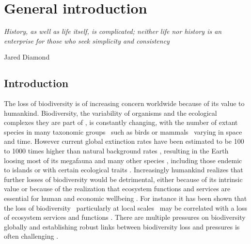 \chapter{General introduction}
\epigraph{\emph{History, as well as life itself, is complicated; neither life nor history is an enterprise for those who seek simplicity and consistency}}{Jared Diamond}
\label{C01}

\section{Introduction}
\label{C01_01}

The loss of biodiversity is of increasing concern worldwide because of its value to humankind. Biodiversity, the variability of organisms and the ecological complexes they are part of \citep{SecretariatoftheConventiononBiologicalDiversity2014}, is constantly changing, with the number of extant species in many taxonomic groups \textendash\ such as birds \citep{Jetz2012} or mammals \citep{Upham2019} \textendash\ varying in space and time. However current global extinction rates have been estimated to be 100 to 1000 times higher than natural background rates \citep{Pimm2014,Mace2014}, resulting in the Earth loosing most of its megafauna and many other species \citep{Sandom2014,Ceballos2017,Hallmann2017}, including those endemic to islands \citep{Blackburn2004} or with certain ecological traits \citep{Fritz2009}. Increasingly humankind realizes that further losses of biodiversity would be detrimental, either because of its intrinsic value or because of the realization that ecosystem functions and services are essential for human and economic wellbeing \citep{Cardinale2012,Mace2014}. For instance it has been shown that the loss of biodiversity \textendash\ particularly at local scales \textendash\ may be correlated with a loss of ecosystem services \citep{Albrecht2014} and functions \citep{Hautier2015,Isbell2015}. There are multiple pressures on biodiversity globally \citep{Butchart2010,Steffen2015} and establishing robust links between biodiversity loss and pressures is often challenging \citep{Cardinale2018,DePalma2018}.

